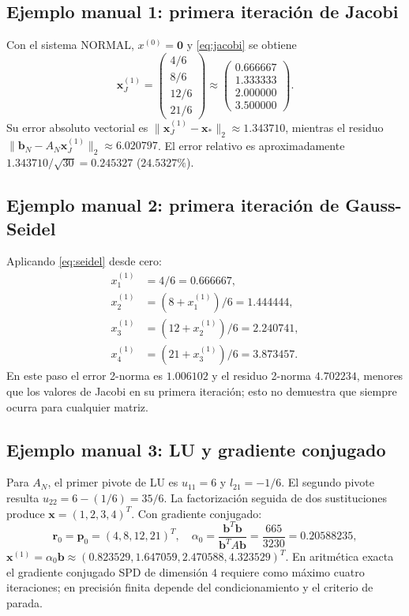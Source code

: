 \documentclass[letterpaper,11pt]{article}
\begin{document}
\subsection{Ejemplo manual 1: primera iteración de Jacobi}
Con el sistema NORMAL, $x^{(0)}=\boldsymbol{0}$ y \eqref{eq:jacobi} se obtiene
\begin{equation}
\boldsymbol{x}^{(1)}_J=
\begin{pmatrix}4/6\\8/6\\12/6\\21/6\end{pmatrix}
\approx\begin{pmatrix}0.666667\\1.333333\\2.000000\\3.500000\end{pmatrix}.
\end{equation}
Su error absoluto vectorial es $\|\boldsymbol{x}^{(1)}_J-\boldsymbol{x}_*\|_2\approx 1.343710$, mientras el residuo $\|\boldsymbol{b}_N-A_N\boldsymbol{x}^{(1)}_J\|_2\approx6.020797$. El error relativo es aproximadamente $1.343710/\sqrt{30}=0.245327$ ($24.5327\%$).

\subsection{Ejemplo manual 2: primera iteración de Gauss-Seidel}
Aplicando \eqref{eq:seidel} desde cero:
\begin{align*}
x_1^{(1)}&=4/6=0.666667,\\
x_2^{(1)}&=(8+x_1^{(1)})/6=1.444444,\\
x_3^{(1)}&=(12+x_2^{(1)})/6=2.240741,\\
x_4^{(1)}&=(21+x_3^{(1)})/6=3.873457.
\end{align*}
En este paso el error 2-norma es $1.006102$ y el residuo 2-norma $4.702234$, menores que los valores de Jacobi en su primera iteración; esto no demuestra que siempre ocurra para cualquier matriz.

\subsection{Ejemplo manual 3: LU y gradiente conjugado}
Para $A_N$, el primer pivote de LU es $u_{11}=6$ y $l_{21}=-1/6$. El segundo pivote resulta $u_{22}=6-(1/6)=35/6$. La factorización seguida de dos sustituciones produce $\boldsymbol{x}=(1,2,3,4)^T$. Con gradiente conjugado:
\begin{equation*}
\boldsymbol{r}_0=\boldsymbol{p}_0=(4,8,12,21)^T,\quad
\alpha_0=\frac{\boldsymbol{b}^T\boldsymbol{b}}{\boldsymbol{b}^TA\boldsymbol{b}}=\frac{665}{3230}=0.20588235,
\end{equation*}
$\boldsymbol{x}^{(1)}=\alpha_0\boldsymbol{b}\approx(0.823529,1.647059,2.470588,4.323529)^T$. En aritmética exacta el gradiente conjugado SPD de dimensión $4$ requiere como máximo cuatro iteraciones; en precisión finita depende del condicionamiento y el criterio de parada.
\end{document}

